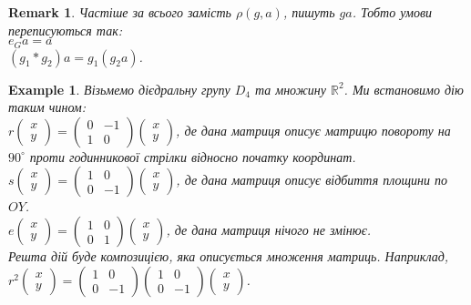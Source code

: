 \documentclass[a4paper, 10pt]{article}
\theoremstyle{theoremdd}
\theoremstyle{theoremdd}
\theoremstyle{theoremdd}
\theoremstyle{theoremdd}
\theoremstyle{theoremdd}
\newtheorem{example}[theorem]{Example}
\theoremstyle{theoremdd}
\theoremstyle{theoremdd}
\theoremstyle{theoremdd}
\theoremstyle{theoremdd}
\theoremstyle{theoremdd}
\theoremstyle{theoremdd}
\newtheorem{remark}[theorem]{Remark}
\theoremstyle{theoremdd}
\theoremstyle{theoremdd}
\theoremstyle{theoremdd}
\theoremstyle{theoremdd}
\begin{document}
\begin{remark}
Частіше за всього замість $\rho(g,a)$, пишуть $ga$. Тобто умови переписуються так:\\
$e_Ga = a$\\
$(g_1*g_2)a = g_1(g_2a)$.
\end{remark}

\begin{example}
Візьмемо дієдральну групу $D_4$ та множину $\mathbb{R}^2$. Ми встановимо дію таким чином:\\
$r \begin{pmatrix}
x \\ y
\end{pmatrix} = \begin{pmatrix}
0 & -1 \\
1 & 0
\end{pmatrix} \begin{pmatrix}
x \\ y
\end{pmatrix}$, де дана матриця описує матрицю повороту на $90^\circ$ проти годинникової стрілки відносно початку координат.\\
$s \begin{pmatrix}
x \\ y
\end{pmatrix} = \begin{pmatrix}
1 & 0 \\
0 & -1
\end{pmatrix} \begin{pmatrix}
x \\ y
\end{pmatrix}$, де дана матриця описує відбиття площини по $OY$.\\
$e \begin{pmatrix}
x \\ y
\end{pmatrix} = \begin{pmatrix}
1 & 0 \\
0 & 1
\end{pmatrix} \begin{pmatrix}
x \\ y
\end{pmatrix}$, де дана матриця нічого не змінює.\\
Решта дій буде композицією, яка описується множення матриць. Наприклад, $r^2 \begin{pmatrix}
x \\ y
\end{pmatrix} = \begin{pmatrix}
1 & 0 \\
0 & -1
\end{pmatrix} \begin{pmatrix}
1 & 0 \\
0 & -1
\end{pmatrix} \begin{pmatrix}
x \\ y
\end{pmatrix}$.
\end{example}
\end{document}
